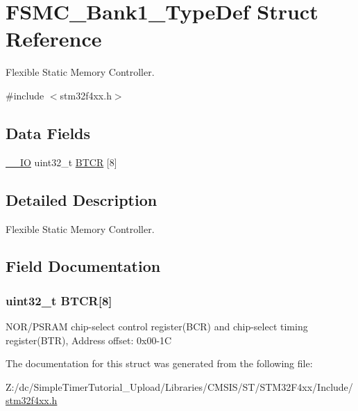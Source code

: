 \hypertarget{struct_f_s_m_c___bank1___type_def}{\section{F\-S\-M\-C\-\_\-\-Bank1\-\_\-\-Type\-Def Struct Reference}
\label{struct_f_s_m_c___bank1___type_def}
}


Flexible Static Memory Controller.  




{\ttfamily \#include $<$stm32f4xx.\-h$>$}

\subsection*{Data Fields}
\begin{DoxyCompactItemize}
\item 
\hyperlink{group___c_m_s_i_s__core__definitions_gaec43007d9998a0a0e01faede4133d6be}{\-\_\-\-\_\-\-I\-O} uint32\-\_\-t \hyperlink{struct_f_s_m_c___bank1___type_def_a80a6708b507f6eecbc10424fdb088b79}{B\-T\-C\-R} \mbox{[}8\mbox{]}
\end{DoxyCompactItemize}


\subsection{Detailed Description}
Flexible Static Memory Controller. 

\subsection{Field Documentation}
\hypertarget{struct_f_s_m_c___bank1___type_def_a80a6708b507f6eecbc10424fdb088b79}{
\subsubsection[{B\-T\-C\-R}]{ uint32\-\_\-t B\-T\-C\-R\mbox{[}8\mbox{]}}}\label{struct_f_s_m_c___bank1___type_def_a80a6708b507f6eecbc10424fdb088b79}
N\-O\-R/\-P\-S\-R\-A\-M chip-\/select control register(\-B\-C\-R) and chip-\/select timing register(\-B\-T\-R), Address offset\-: 0x00-\/1\-C 

The documentation for this struct was generated from the following file\-:\begin{DoxyCompactItemize}
\item 
Z\-:/dc/\-Simple\-Timer\-Tutorial\-\_\-\-Upload/\-Libraries/\-C\-M\-S\-I\-S/\-S\-T/\-S\-T\-M32\-F4xx/\-Include/\hyperlink{stm32f4xx_8h}{stm32f4xx.\-h}\end{DoxyCompactItemize}
